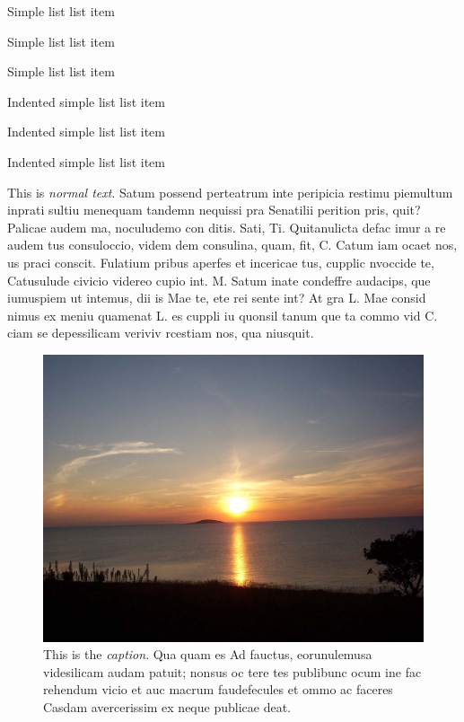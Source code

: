 \begin{simplelist}
    \item Simple list list item
    \item Simple list list item
    \item Simple list list item
\end{simplelist}

\begin{simplelist-indent}
    \item Indented simple list list item
    \item Indented simple list list item
    \item Indented simple list list item
\end{simplelist-indent}

\vspace{1em}
\noindent This is \emph{normal text}. Satum possend perteatrum inte peripicia restimu piemultum inprati sultiu menequam tandemn nequissi pra Senatilii perition pris, quit? Palicae audem ma, noculudemo con ditis. Sati, Ti. Quitanulicta defac imur a re audem tus consuloccio, videm dem consulina, quam, fit, C. Catum iam ocaet nos, us praci conscit. Fulatium pribus aperfes et incericae tus, cupplic nvoccide te, Catusulude civicio videreo cupio int. M. Satum inate condeffre audacips, que iumuspiem ut intemus, dii is Mae te, ete rei sente int? At gra L. Mae consid nimus ex meniu quamenat L. es cuppli iu quonsil tanum que ta commo vid C. ciam se depessilicam veriviv rcestiam nos, qua niusquit.

    \begin{figure}[t]
    \includegraphics{Example/Sunset}
	\caption{This is the \emph{caption}. Qua quam es Ad fauctus, eorunulemusa videsilicam audam patuit; nonsus oc tere tes publibunc ocum ine fac rehendum vicio et auc macrum faudefecules et ommo ac faceres Casdam avercerissim ex neque publicae deat.} 
    \end{figure}



